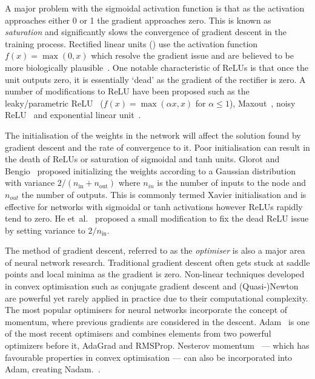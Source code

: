 \documentclass[12pt, twoside]{book}
\renewcommand\emph[1]{\textit{\color{USred}{#1}}}
\begin{document}
A major problem with the sigmoidal activation function is that as the activation approaches either 0 or 1 the gradient approaches zero. This is known as \textit{saturation} and significantly slows the convergence of gradient descent in the training process. Rectified linear units (\emph{ReLUs}) use the activation function $f(x) = \max(0,x)$ which resolve the gradient issue and are believed to be more biologically plausible~\cite{relu,relubiology}. One notable characteristic of ReLUs is that once the unit outputs zero, it is essentially `dead' as the gradient of the rectifier is zero. A number of modifications to ReLU have been proposed such as the leaky/parametric ReLU~\cite{he2015delving} ($f(x) = \max(\alpha x, x)$ for $\alpha\leq 1$), Maxout~\cite{goodfellow2013maxout}, noisy ReLU~\cite{noisyrelu} and exponential linear unit~\cite{clevert2015fast}.

The initialisation of the weights in the network will affect the solution found by gradient descent and the rate of convergence to it. Poor initialisation can result in the death of ReLUs or saturation of sigmoidal and tanh units. Glorot and Bengio~\cite{glorot2010understanding} proposed initializing the weights according to a Gaussian distribution with variance $2/(n_{\text{in}}+n_{\text{out}})$ where $n_{in}$ is the number of inputs to the node and $n_{out}$ the number of outputs. This is commonly termed Xavier initialisation and is effective for networks with sigmoidal or tanh activations however ReLUs rapidly tend to zero. He et~al.~\cite{he2015delving} proposed a small modification to fix the dead ReLU issue by setting variance to $2/n_{\text{in}}$.

The method of gradient descent, referred to as the \textit{optimiser} is also a major area of neural network research. Traditional gradient descent often gets stuck at saddle points and local minima as the gradient is zero. Non-linear techniques developed in convex optimisation such as conjugate gradient descent and (Quasi-)Newton are powerful yet rarely applied in practice due to their computational complexity. The most popular optimisers for neural networks incorporate the concept of momentum, where previous gradients are considered in the descent. Adam~\cite{adam} is one of the most recent optimisers and combines elements from two powerful optimizers before it, AdaGrad and RMSProp. Nesterov momentum~\cite{nesterov1983method} --- which has favourable properties in convex optimisation --- can also be incorporated into Adam, creating Nadam.~\cite{nadam}. 
\end{document}
